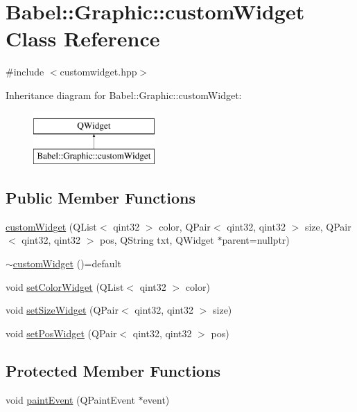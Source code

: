 \hypertarget{classBabel_1_1Graphic_1_1customWidget}{}\section{Babel\+:\+:Graphic\+:\+:custom\+Widget Class Reference}
\label{classBabel_1_1Graphic_1_1customWidget}


{\ttfamily \#include $<$customwidget.\+hpp$>$}

Inheritance diagram for Babel\+:\+:Graphic\+:\+:custom\+Widget\+:\begin{figure}[H]
\begin{center}
\leavevmode
\includegraphics[height=2.000000cm]{classBabel_1_1Graphic_1_1customWidget}
\end{center}
\end{figure}
\subsection*{Public Member Functions}
\begin{DoxyCompactItemize}
\item 
\hyperlink{classBabel_1_1Graphic_1_1customWidget_add9fbbad31fb1d838f3816d0a98a79cc}{custom\+Widget} (Q\+List$<$ qint32 $>$ color, Q\+Pair$<$ qint32, qint32 $>$ size, Q\+Pair$<$ qint32, qint32 $>$ pos, Q\+String txt, Q\+Widget $\ast$parent=nullptr)
\item 
\hyperlink{classBabel_1_1Graphic_1_1customWidget_a052017c10efd1d1754583d615a238b73}{$\sim$custom\+Widget} ()=default
\item 
void \hyperlink{classBabel_1_1Graphic_1_1customWidget_aeea58299a81ac46d8b5a25220789e533}{set\+Color\+Widget} (Q\+List$<$ qint32 $>$ color)
\item 
void \hyperlink{classBabel_1_1Graphic_1_1customWidget_a47e9f116a1a90aae19f60bf1fa559146}{set\+Size\+Widget} (Q\+Pair$<$ qint32, qint32 $>$ size)
\item 
void \hyperlink{classBabel_1_1Graphic_1_1customWidget_ad9abc40a0d4346e00a433d4f5694c39c}{set\+Pos\+Widget} (Q\+Pair$<$ qint32, qint32 $>$ pos)
\end{DoxyCompactItemize}
\subsection*{Protected Member Functions}
\begin{DoxyCompactItemize}
\item 
void \hyperlink{classBabel_1_1Graphic_1_1customWidget_aa50ce04827e61129f279cf3e6073ad0c}{paint\+Event} (Q\+Paint\+Event $\ast$event)
\end{DoxyCompactItemize}


